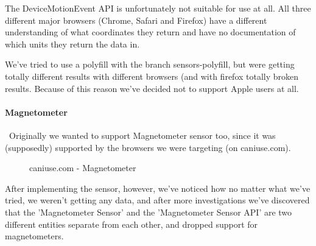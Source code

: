 The DeviceMotionEvent API is unfortunately not suitable for use at all. All three different major browsers (Chrome, Safari and Firefox) have a different understanding of what coordinates they return and have no documentation of which units they return the data in.

We've tried to use a polyfill with the branch sensors-polyfill, but were getting totally different results with different browsers (and with firefox totally broken results. Because of this reason we've decided not to support Apple users at all.

\paragraph{Magnetometer} \
Originally we wanted to support Magnetometer sensor too, since it was (supposedly) supported by the browsers we were targeting (on caniuse.com).
\begin{center}
\end{center}

\begin{figure}[ht]
    \centering
    \caption{caniuse.com - Magnetometer}
\end{figure}



After implementing the sensor, however, we've noticed how no matter what we've tried, we weren't getting any data, and after more investigations we've discovered that the 'Magnetometer Sensor' and the 'Magnetometer Sensor API' are two different entities separate from each other, and dropped support for magnetometers.

